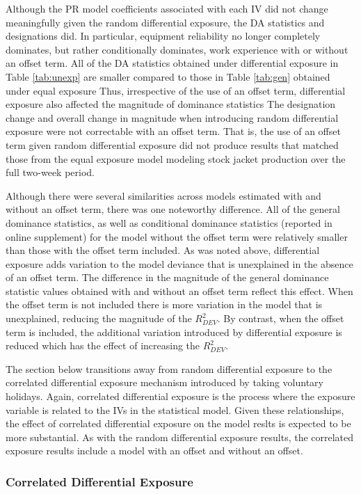 \documentclass[ShortAfour,times,sageapa]{sagej}
\begin{document}
	Although the PR model coefficients associated with each IV did not change meaningfully given the random differential exposure, the DA statistics and designations did. 
	In particular, equipment reliability no longer completely dominates, but rather conditionally dominates, work experience with or without an offset term.
	All of the DA statistics obtained under differential exposure in Table \ref{tab:unexp} are smaller compared to those in Table \ref{tab:gen} obtained under equal exposure 
	Thus, irrespective of the use of an offset term, differential exposure also affected the magnitude of dominance statistics
	The designation change and overall change in magnitude when introducing random differential exposure were not correctable with an offset term. 
	That is, the use of an offset term given random differential exposure did not produce results that matched those from the equal exposure model modeling stock jacket production over the full two-week period.
	
	Although there were several similarities across models estimated with and without an offset term, there was one noteworthy difference.
	All of the general dominance statistics, as well as conditional dominance statistics (reported in online supplement) for the model without the offset term were relatively smaller than those with the offset term included.
	As was noted above, differential exposure adds variation to the model deviance that is unexplained in the absence of an offset term.
	The difference in the magnitude of the general dominance statistic values obtained with and without an offset term reflect this effect.
	When the offset term is not included there is more variation in the model that is unexplained, reducing the magnitude of the $R^2_{DEV}$.
	By contrast, when the offset term is included, the additional variation introduced by differential exposure is reduced which has the effect of increasing the $R^2_{DEV}$.
	
	The section below transitions away from random differential exposure to the correlated differential exposure mechanism introduced by taking voluntary holidays.
	Again, correlated differential exposure is the process where the exposure variable is related to the IVs in the statistical model.
	Given these relationships, the effect of correlated differential exposure on the model reslts is expected to be more substantial.
	As with the random differential exposure results, the correlated exposure results include a model with an offset and without an offset.
	
		\subsubsection{Correlated Differential Exposure}
		
\end{document}

